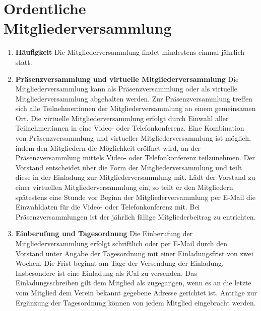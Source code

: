 \documentclass{scrartcl}
\begin{document}
    \section{Ordentliche Mitgliederversammlung}
        \begin{enumerate}
            \item \textbf{Häufigkeit} \newline
                Die Mitgliederversammlung findet mindestens einmal jährlich statt.
            \item \textbf{Präsenzversammlung und virtuelle Mitgliederversammlung} \newline
                Die Mitgliederversammlung kann als Präsenzversammlung oder als virtuelle
                Mitgliederversammlung abgehalten werden. Zur Präsenzversammlung treffen sich alle
                Teilnehmer:innen der Mitgliederversammlung an einem gemeinsamen Ort. Die virtuelle
                Mitgliederversammlung erfolgt durch Einwahl aller Teilnehmer:innen in eine Video- oder
                Telefonkonferenz. Eine Kombination von Präsenzversammlung und virtueller
                Mitgliederversammlung ist möglich, indem den Mitgliedern die Möglichkeit eröffnet wird, an der
                Präsenzversammlung mittels Video- oder Telefonkonferenz teilzunehmen. Der Vorstand
                entscheidet über die Form der Mitgliederversammlung und teilt diese in der Einladung zur
                Mitgliederversammlung mit. Lädt der Vorstand zu einer virtuellen Mitgliederversammlung ein,
                so teilt er den Mitgliedern spätestens eine Stunde vor Beginn der Mitgliederversammlung per
                E-Mail die Einwahldaten für die Video- oder Telefonkonferenz mit.
                Bei Präsenzversammlungen ist der jährlich fällige Mitgliederbeitrag zu entrichten.
            \item \textbf{Einberufung und Tagesordnung} \newline
                Die Einberufung der Mitgliederversammlung erfolgt schriftlich oder per E-Mail durch den
                Vorstand unter Angabe der Tagesordnung mit einer Einladungsfrist von zwei Wochen. Die
                Frist beginnt am Tage der Versendung der Einladung.
                Insbesondere ist eine Einladung als iCal zu versenden.
                Das Einladungsschreiben gilt dem Mitglied als zugegangen, wenn es an die letzte vom Mitglied dem Verein bekannt gegebene
                Adresse gerichtet ist.
                Anträge zur Ergänzung der Tagesordnung können von jedem Mitglied eingebracht werden.

\end{enumerate}
\end{document}
